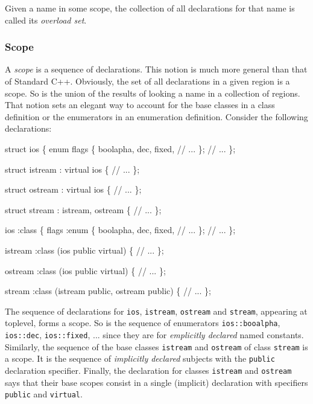 \documentclass[a4paper,12pt]{article}
\begin{document}
Given a name in some scope, the collection of all declarations for that name
is called its \emph{overload set}.


\subsubsection{Scope}
\label{sec:intro:general-notion:scope}
A \emph{scope} is a sequence of declarations. This notion is much more
general than that of Standard C++.  Obviously, the set of all declarations in
a given region is a scope.  So is the union of the results of looking a name
in a collection of regions.  That notion sets an elegant way to
account for the base classes in a class definition or the enumerators in
an enumeration definition.  Consider the following declarations:
\begin{center}
  \begin{minipage}[t]{6cm}
    \begin{Program}
struct ios \{
  enum flags \{
    boolapha, dec, fixed,
    // ...
  \};
  // ...
\};

struct istream : virtual ios \{
  // ...
\};

struct ostream : virtual ios \{
  // ...
\};

struct stream : istream,
                ostream \{
  // ...
\};
    \end{Program}
  \end{minipage}\hfil \vrule \hfil
  \begin{minipage}[t]{6cm}
    \begin{Program}
ios :class \{
  flags :enum \{
    boolapha, dec, fixed,
    // ...
  \};
  // ...
\};

istream :class (ios public virtual) \{
  // ...
\};

ostream :class (ios public virtual) \{
  // ...
\};

stream :class (istream public,
               ostream public) \{
  // ...
\};
    \end{Program}
  \end{minipage}
\end{center}

The sequence of declarations for \texttt{ios}, \texttt{istream},
\texttt{ostream} and \texttt{stream}, appearing at toplevel, forms a scope.
So is the sequence of enumerators \texttt{ios::booalpha}, \texttt{ios::dec},
\texttt{ios::fixed}, ...  since they are for \emph{emplicitly declared}
named constants.  Similarly, the sequence of the base classes
\texttt{istream} and \texttt{ostream} of class \texttt{stream} is  a scope.
It is the sequence of \emph{implicitly declared} subjects with the
\texttt{public} declaration specifier.  Finally, the declaration for classes
\texttt{istream} and \texttt{ostream} says that their base scopes consist in
a single (implicit) declaration with specifiers \texttt{public} and
\texttt{virtual}.
\end{document}
